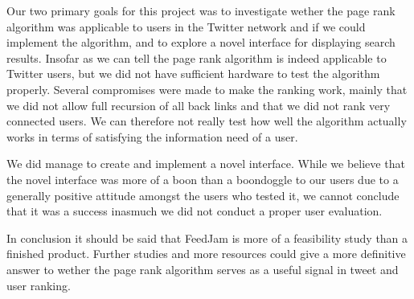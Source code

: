 Our two primary goals for this project was to investigate wether the page rank algorithm was applicable to users in the Twitter network and if we could implement the algorithm, and to explore a novel interface for displaying search results. Insofar as we can tell the page rank algorithm is indeed applicable to Twitter users, but we did not have sufficient hardware to test the algorithm properly. Several compromises were made to make the ranking work, mainly that we did not allow full recursion of all back links and that we did not rank very connected users. We can therefore not really test how well the algorithm actually works in terms of satisfying the information need of a user.

We did manage to create and implement a novel interface. While we believe that the novel interface was more of a boon than a boondoggle to our users due to a generally positive attitude amongst the users who tested it, we cannot conclude that it was a success inasmuch we did not conduct a proper user evaluation.

In conclusion it should be said that FeedJam is more of a feasibility study than a finished product. Further studies and more resources could give a more definitive answer to wether the page rank algorithm serves as a useful signal in tweet and user ranking.